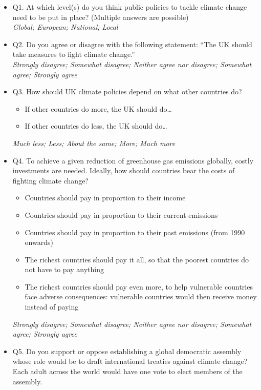 \documentclass{article}
\begin{document}
\begin{itemize}
    \item Q1. At which level(s) do you think public policies to tackle climate change need to be put in place? (Multiple answers are possible)  \\
    \textit{Global; European; National; Local}
    \item Q2. Do you agree or disagree with the following statement: ``The UK should take measures to fight climate change.'' \\
    \textit{Strongly disagree; Somewhat disagree; Neither agree nor disagree; Somewhat agree; Strongly agree}
    \item Q3. How should UK climate policies depend on what other countries do?
    \begin{itemize}
        \item If other countries do more, the UK should do… 
        \item If other countries do less, the UK should do…
    \end{itemize}
    \textit{Much less; Less; About the same; More; Much more}
    \item Q4. To achieve a given reduction of greenhouse gas emissions globally, costly investments are needed.
    Ideally, how should countries bear the costs of fighting climate change?
    \begin{itemize}
        \item Countries should pay in proportion to their income
        \item Countries should pay in proportion to their current emissions
        \item Countries should pay in proportion to their past emissions (from 1990 onwards)
        \item The richest countries should pay it all, so that the poorest countries do not have to pay anything
        \item The richest countries should pay even more, to help vulnerable countries face adverse consequences: vulnerable countries would then receive money instead of paying
    \end{itemize}
    \textit{Strongly disagree; Somewhat disagree; Neither agree nor disagree; Somewhat agree; Strongly agree}
    \item Q5. Do you support or oppose establishing a global democratic assembly whose role would be to draft international treaties against climate change? Each adult across the world would have one vote to elect members of the assembly.  \\

\end{itemize}
\end{document}
